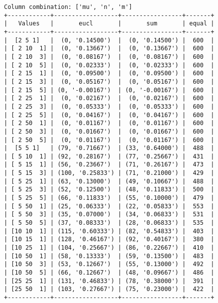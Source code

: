 \documentclass{article}
\begin{document}
\begin{verbatim}
Column combination: ['mu', 'n', 'm']
+------------+------------------+-----------------+-------+
|   Values   |       eucl       |       sum       | equal |
+------------+------------------+-----------------+-------+
|  [2 5 1]   |  (0, '0.14500')  |  (0, '0.14500') |  600  |
| [ 2 10  1] |  (0, '0.13667')  |  (0, '0.13667') |  600  |
| [ 2 10  3] |  (0, '0.08167')  |  (0, '0.08167') |  600  |
| [ 2 10  5] |  (0, '0.02333')  |  (0, '0.02333') |  600  |
| [ 2 15  1] |  (0, '0.09500')  |  (0, '0.09500') |  600  |
| [ 2 15  3] |  (0, '0.05167')  |  (0, '0.05167') |  600  |
| [ 2 15  5] | (0, '-0.00167')  | (0, '-0.00167') |  600  |
| [ 2 25  1] |  (0, '0.02167')  |  (0, '0.02167') |  600  |
| [ 2 25  3] |  (0, '0.05333')  |  (0, '0.05333') |  600  |
| [ 2 25  5] |  (0, '0.04167')  |  (0, '0.04167') |  600  |
| [ 2 50  1] |  (0, '0.01167')  |  (0, '0.01167') |  600  |
| [ 2 50  3] |  (0, '0.01667')  |  (0, '0.01667') |  600  |
| [ 2 50  5] |  (0, '0.01167')  |  (0, '0.01167') |  600  |
|  [5 5 1]   | (79, '0.71667')  | (33, '0.64000') |  488  |
| [ 5 10  1] | (92, '0.28167')  | (77, '0.25667') |  431  |
| [ 5 15  1] | (56, '0.23667')  | (71, '0.26167') |  473  |
| [ 5 15  3] | (100, '0.25833') | (71, '0.21000') |  429  |
| [ 5 25  1] | (63, '0.13000')  | (49, '0.10667') |  488  |
| [ 5 25  3] | (52, '0.12500')  | (48, '0.11833') |  500  |
| [ 5 25  5] | (66, '0.11833')  | (55, '0.10000') |  479  |
| [ 5 50  1] | (25, '0.06333')  | (22, '0.05833') |  553  |
| [ 5 50  3] | (35, '0.07000')  | (34, '0.06833') |  531  |
| [ 5 50  5] | (37, '0.08333')  | (28, '0.06833') |  535  |
| [10 10  1] | (115, '0.60333') | (82, '0.54833') |  403  |
| [10 15  1] | (128, '0.46167') | (92, '0.40167') |  380  |
| [10 25  1] | (104, '0.25667') | (86, '0.22667') |  410  |
| [10 50  1] | (58, '0.13333')  | (59, '0.13500') |  483  |
| [10 50  3] | (53, '0.12667')  | (55, '0.13000') |  492  |
| [10 50  5] | (66, '0.12667')  | (48, '0.09667') |  486  |
| [25 25  1] | (131, '0.46833') | (78, '0.38000') |  391  |
| [25 50  1] | (103, '0.27667') | (75, '0.23000') |  422  |
+------------+------------------+-----------------+-------+
\end{verbatim}
\end{document}
